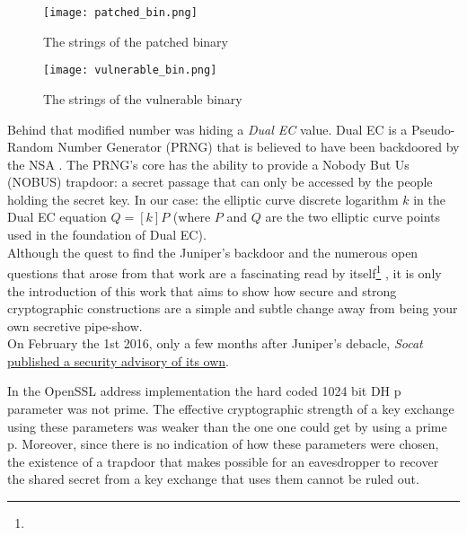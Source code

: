 \documentclass[a4paper,11pt,twocolumn]{article}
\begin{document}
\begin{figure}[H]
\centering
\texttt{[image: patched\_bin.png]}
\caption{The strings of the patched binary}\label{screenOS}
\end{figure}

\begin{figure}[H]
\centering
\texttt{[image: vulnerable\_bin.png]}
\caption{The strings of the vulnerable binary}\label{screenOS}
\end{figure}

Behind that modified number was hiding a \emph{Dual EC} value. Dual EC is a Pseudo-Random Number Generator (PRNG) that is believed to have been backdoored by the NSA \cite{dualEC}. The PRNG's core has the ability to provide a Nobody But Us (NOBUS) trapdoor: a secret passage that can only be accessed by the people holding the secret key. In our case: the elliptic curve discrete logarithm $k$ in the Dual EC equation $Q = [k]P$ (where $P$ and $Q$ are the two elliptic curve points used in the foundation of Dual EC).\\

Although the quest to find the Juniper's backdoor and the numerous open questions that arose from that work are a fascinating read by itself\footnote{} \cite{juniper}, it is only the introduction of this work that aims to show how secure and strong cryptographic constructions are a simple and subtle change away from being your own secretive pipe-show.\\

On February the 1st 2016, only a few months after Juniper's debacle, \emph{Socat} \href{http://www.openwall.com/lists/oss-security/2016/02/01/4}{published a security advisory of its own}.

\begin{displayquote}
In the OpenSSL address implementation the hard coded 1024 bit DH p parameter was not prime. The effective cryptographic strength of a key exchange using these parameters was weaker than the one one could get by using a prime p. Moreover, since there is no indication of how these parameters were chosen, the existence of a trapdoor that makes possible for an eavesdropper to recover the shared secret from a key exchange that uses them cannot be ruled out.
\end{displayquote}
\end{document}
